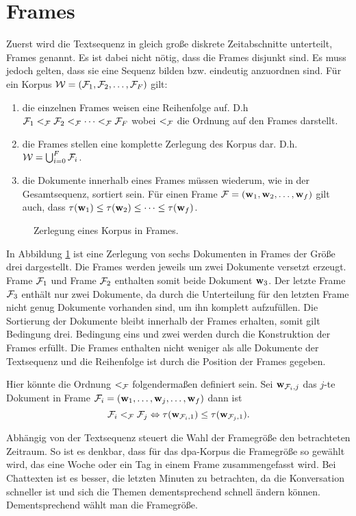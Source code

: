 \section{Frames}

Zuerst wird die Textsequenz in gleich große diskrete Zeitabschnitte unterteilt, Frames genannt. Es ist dabei nicht nötig, dass die Frames disjunkt sind. Es muss jedoch gelten, dass sie eine Sequenz bilden bzw. eindeutig anzuordnen sind. Für ein Korpus $\mathcal{W}=(\mathcal{F}_1,\mathcal{F}_2,\ldots,\mathcal{F}_F)$ gilt:
\begin{enumerate}
\item die einzelnen Frames weisen eine Reihenfolge auf. D.h $\mathcal{F}_1 <_{\mathcal{F}} \mathcal{F}_2 <_{\mathcal{F}} \cdots <_{\mathcal{F}} \mathcal{F}_F$ wobei $<_{\mathcal{F}}$ die Ordnung auf den Frames darstellt. 
\item die Frames stellen eine komplette Zerlegung des Korpus dar. D.h. $\mathcal{W}=\bigcup^F_{i=0}\mathcal{F}_i$.
\item die Dokumente innerhalb eines Frames müssen wiederum, wie in der Gesamtsequenz, sortiert sein. Für einen Frame $\mathcal{F}=(\mathbf{w}_1,\mathbf{w}_2,\ldots,\mathbf{w}_f)$ gilt auch, dass $\tau(\mathbf{w}_1) \leq \tau(\mathbf{w}_2) \leq \cdots \leq \tau(\mathbf{w}_f)$. 
\end{enumerate}

\begin{figure}[ht]
\centering

\caption{Zerlegung eines Korpus in Frames.}
\label{fig:framePic}
\end{figure}

In Abbildung \ref{fig:framePic} ist eine Zerlegung von sechs Dokumenten in Frames der Größe drei dargestellt. Die Frames werden jeweils um zwei Dokumente versetzt erzeugt. Frame $\mathcal{F}_1$ und Frame $\mathcal{F}_2$ enthalten somit beide Dokument $\mathbf{w}_3$. Der letzte Frame $\mathcal{F}_3$ enthält nur zwei Dokumente, da durch die Unterteilung für den letzten Frame nicht genug Dokumente vorhanden sind, um ihn komplett aufzufüllen. Die Sortierung der Dokumente bleibt innerhalb der Frames erhalten, somit gilt Bedingung drei. Bedingung eins und zwei werden durch die Konstruktion der Frames erfüllt. Die Frames enthalten nicht weniger als alle Dokumente der Textsequenz und die Reihenfolge ist durch die Position der Frames gegeben. 

Hier könnte die Ordnung $<_{\mathcal{F}}$ folgendermaßen definiert sein. Sei $\mathbf{w}_{\mathcal{F}_i,j}$ das $j$-te Dokument in Frame $\mathcal{F}_i=(\mathbf{w}_1,\ldots,\mathbf{w}_j,\ldots,\mathbf{w}_f)$ dann ist  
\[
\mathcal{F}_i <_{\mathcal{F}} \mathcal{F}_j \Leftrightarrow \tau(\mathbf{w}_{\mathcal{F}_i,1}) \leq \tau(\mathbf{w}_{\mathcal{F}_j,1})\text{.}
\]


Abhängig von der Textsequenz steuert die Wahl der Framegröße den betrachteten Zeitraum. So ist es denkbar, dass für das dpa-Korpus die Framegröße so gewählt wird, das eine Woche oder ein Tag in einem Frame zusammengefasst wird. Bei Chattexten ist es besser, die letzten Minuten zu betrachten, da die Konversation schneller ist und sich die Themen dementsprechend schnell ändern können. Dementsprechend wählt man die Framegröße.